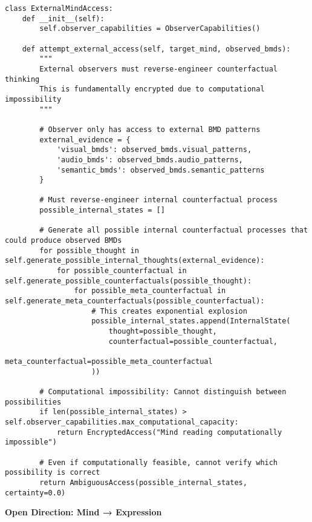\documentclass[12pt,a4paper]{article}
\begin{document}
\begin{lstlisting}[style=pythonstyle, caption=Why External Mind Access Is Encrypted]
class ExternalMindAccess:
    def __init__(self):
        self.observer_capabilities = ObserverCapabilities()
        
    def attempt_external_access(self, target_mind, observed_bmds):
        """
        External observers must reverse-engineer counterfactual thinking
        This is fundamentally encrypted due to computational impossibility
        """
        
        # Observer only has access to external BMD patterns
        external_evidence = {
            'visual_bmds': observed_bmds.visual_patterns,
            'audio_bmds': observed_bmds.audio_patterns,
            'semantic_bmds': observed_bmds.semantic_patterns
        }
        
        # Must reverse-engineer internal counterfactual process
        possible_internal_states = []
        
        # Generate all possible internal counterfactual processes that could produce observed BMDs
        for possible_thought in self.generate_possible_internal_thoughts(external_evidence):
            for possible_counterfactual in self.generate_possible_counterfactuals(possible_thought):
                for possible_meta_counterfactual in self.generate_meta_counterfactuals(possible_counterfactual):
                    # This creates exponential explosion
                    possible_internal_states.append(InternalState(
                        thought=possible_thought,
                        counterfactual=possible_counterfactual,
                        meta_counterfactual=possible_meta_counterfactual
                    ))
        
        # Computational impossibility: Cannot distinguish between possibilities
        if len(possible_internal_states) > self.observer_capabilities.max_computational_capacity:
            return EncryptedAccess("Mind reading computationally impossible")
        
        # Even if computationally feasible, cannot verify which possibility is correct
        return AmbiguousAccess(possible_internal_states, certainty=0.0)
\end{lstlisting}

\textbf{Open Direction: Mind → Expression}
\end{document}
